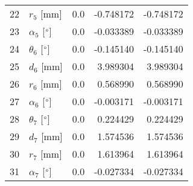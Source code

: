 \documentclass{standalone}%
\begin{document}
\begin{tabular}{llrrr}
22 &              $r_{5}$ [mm] &      0.0 &  -0.748172 &  -0.748172 \\
23 &  $\alpha_{5}$ [$\degree$] &      0.0 &  -0.033389 &  -0.033389 \\
24 &  $\theta_{6}$ [$\degree$] &      0.0 &  -0.145140 &  -0.145140 \\
25 &              $d_{6}$ [mm] &      0.0 &   3.989304 &   3.989304 \\
26 &              $r_{6}$ [mm] &      0.0 &   0.568990 &   0.568990 \\
27 &  $\alpha_{6}$ [$\degree$] &      0.0 &  -0.003171 &  -0.003171 \\
28 &  $\theta_{7}$ [$\degree$] &      0.0 &   0.224429 &   0.224429 \\
29 &              $d_{7}$ [mm] &      0.0 &   1.574536 &   1.574536 \\
30 &              $r_{7}$ [mm] &      0.0 &   1.613964 &   1.613964 \\
31 &  $\alpha_{7}$ [$\degree$] &      0.0 &  -0.027334 &  -0.027334 \\
\bottomrule
\end{tabular}
%
\end{document}
